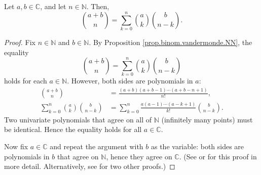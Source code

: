\begin{theorem}
\label{thm.binom.vandermonde.CC}
\leantarget
\leanok
Let $a,b\in\mathbb{C}$, and let
$n\in\mathbb{N}$. Then,
\[
\binom{a+b}{n}=\sum_{k=0}^{n}\binom{a}{k}\binom{b}{n-k}.
\]
\end{theorem}

\begin{proof}
Fix $n\in\mathbb{N}$ and $b\in\mathbb{N}$. By Proposition
\ref{prop.binom.vandermonde.NN}, the equality
\[
\binom{a+b}{n}=\sum_{k=0}^{n}\binom{a}{k}\binom{b}{n-k}
\]
holds for each $a\in\mathbb{N}$. However, both sides are
polynomials in $a$:
\begin{align*}
\binom{a+b}{n} & =\frac{\left(a+b\right)\left(a+b-1\right)\cdots\left(a+b-n+1\right)}{n!},\\
\sum_{k=0}^{n}\binom{a}{k}\binom{b}{n-k} & =\sum_{k=0}^{n}\frac{a\left(
a-1\right)\cdots\left(a-k+1\right)}{k!}\binom{b}{n-k}.
\end{align*}
Two univariate polynomials that agree on all of $\mathbb{N}$ (infinitely many points)
must be identical. Hence the equality holds for all $a\in\mathbb{C}$.

Now fix $a\in\mathbb{C}$ and repeat the argument with $b$ as the variable:
both sides are polynomials in $b$ that agree on $\mathbb{N}$, hence they agree
on $\mathbb{C}$.
(See \cite[proofs of Lemma 7.5.8 and Theorem 7.5.3]{20f} or
\cite[\S 2.17.3]{19s} for this proof in more detail. Alternatively, see
\cite[\S 3.3.2 and \S 3.3.3]{detnotes} for two other proofs.)
\end{proof}
